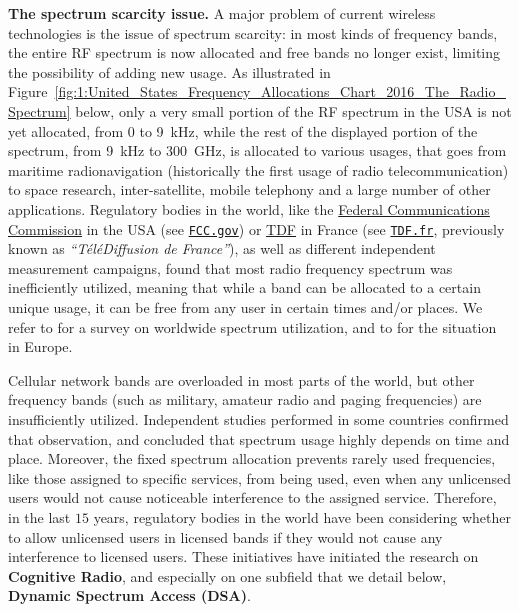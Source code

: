 

\textbf{The spectrum scarcity issue.}
%
A major problem of current wireless technologies is the issue of spectrum scarcity:
in most kinds of frequency bands, the entire RF spectrum is now allocated and free bands no longer exist, limiting the possibility of adding new usage.
As illustrated in Figure~\ref{fig:1:United_States_Frequency_Allocations_Chart_2016_The_Radio_Spectrum} below, only a very small portion of the RF spectrum in the USA is not yet allocated, from $0$ to \SI{9}{\kilo\hertz}, while the rest of the displayed portion of the spectrum, from \SI{9}{\kilo\hertz} to \SI{300}{\giga\hertz}, is allocated to various usages, that goes from maritime radionavigation (historically the first usage of radio telecommunication) to space research, inter-satellite, mobile telephony and a large number of other applications.
%
Regulatory bodies in the world, like the \href{https://www.fcc.gov/}{Federal Communications Commission} in the USA (see \href{https://www.fcc.gov/}{\texttt{FCC.gov}})
or \href{http://www.tdf.fr/}{TDF} in France (see \href{https://www.TDF.fr/}{\texttt{TDF.fr}}, previously known as \emph{``TéléDiffusion de France''}), as well as different independent measurement campaigns, found that most radio frequency spectrum was inefficiently utilized,
meaning that while a band can be allocated to a certain unique usage, it can be free from any user in certain times and/or places.
We refer to \cite{patil2011survey} for a survey on worldwide spectrum utilization, and to \cite{valenta2010survey} for the situation in Europe.

Cellular network bands are overloaded in most parts of the world, but other frequency bands (such as military, amateur radio and paging frequencies) are insufficiently utilized.
Independent studies performed in some countries confirmed that observation, and concluded that spectrum usage highly depends on time and place.
Moreover, the fixed spectrum allocation prevents rarely used frequencies, like those assigned to specific services, from being used, even when any unlicensed users would not cause noticeable interference to the assigned service.
Therefore, in the last $15$ years, regulatory bodies in the world have been considering whether to allow unlicensed users in licensed bands if they would not cause any interference to licensed users.
These initiatives have initiated the research on \textbf{Cognitive Radio},
and especially on one subfield that we detail below, \textbf{Dynamic Spectrum Access (DSA)}.

